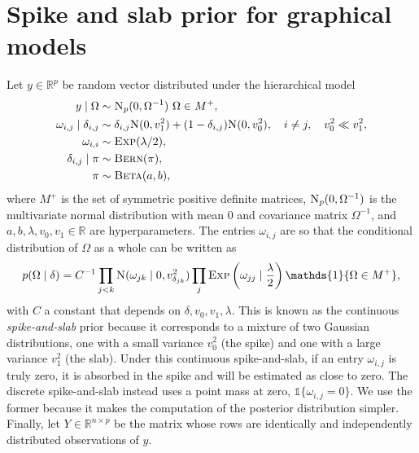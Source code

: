 \documentclass[a4paper, 11pt, oneside]{report}
\newcommand{\R}{\mathbb{R}}
\newcommand{\1}{\mathds{1}}
\newcommand{\inv}{^{-1}}
\newcommand{\Np}{\textsc{N}_p}
\newcommand{\Nor}{\textsc{N}}
\newcommand{\Bern}{\textsc{Bern}}
\newcommand{\Beeta}{\textsc{Beta}}
\newcommand{\Exp}{\textsc{Exp}}
\begin{document}
\section{Spike and slab prior for graphical models}
Let $y \in \R^p$ be random vector distributed under the hierarchical model
\begin{align*}
	y \mid \Omega                  & \sim \Np(0, \Omega\inv)\ \Omega \in M^+,                                                                     \\
	\omega_{i,j} \mid \delta_{i,j} & \sim \delta_{i,j} \Nor(0, v_1^2) + (1 - \delta_{i,j}) \Nor(0, v_0^2), \quad i \neq j, \quad v_0^2 \ll v_1^2, \\
	\omega_{i,i}                   & \sim \textsc{Exp}(\lambda / 2),                                                                              \\
	\delta_{i,j} \mid \pi          & \sim \Bern(\pi),                                                                                             \\
	\pi                            & \sim \Beeta(a,b),
\end{align*}
where $M^+$ is the set of symmetric positive definite matrices, $\Np(0, \Omega\inv)$ is the multivariate normal distribution with mean $0$ and
covariance matrix $\Omega\inv$, and $a, b, \lambda, v_0, v_1 \in \R$ are hyperparameters.
The entries $\omega_{i,j}$ are so that the conditional distribution of $\Omega$ as a whole can be written as
\[p(\Omega \mid \delta) = C\inv \prod_{j < k}  \Nor(\omega_{jk} \mid 0,
	v_{\delta_{jk}}^2) \prod_j \Exp\left(\omega_{jj} \mid \frac{\lambda}{2}\right) \1\{\Omega \in M^+ \},\]
with $C$ a constant that depends on $\delta, v_0, v_1, \lambda$.
This is known as the continuous \emph{spike-and-slab} prior because it
corresponds to a mixture of two Gaussian distributions, one with a small variance
$v_0^2$ (the spike) and one with a large variance $v_1^2$ (the slab).
Under this continuous spike-and-slab, if an entry $\omega_{i,j}$ is truly zero,
it is absorbed in the spike and will be estimated as close to zero. The
discrete spike-and-slab instead uses a point mass at zero, $\1\{\omega_{i,j} =
	0\}$. We use the former because it makes the computation of the posterior
distribution simpler.
Finally, let $Y \in \R^{n \times p}$ be the matrix whose rows are identically and independently distributed
observations of $y$.
\end{document}

